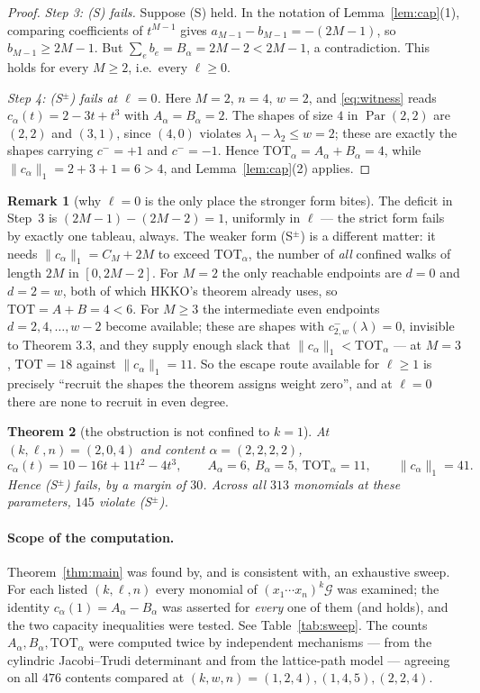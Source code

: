 \documentclass[11pt]{article}
\newtheorem{theorem}{Theorem}
\theoremstyle{definition}
\newtheorem{remark}[theorem]{Remark}
\DeclareMathOperator{\Par}{Par}
\newcommand{\la}{\lambda}
\begin{document}
\begin{proof}
\emph{Step 3: (S) fails.} Suppose (S) held. In the notation of
Lemma~\ref{lem:cap}(1), comparing coefficients of $t^{M-1}$ gives
$a_{M-1}-b_{M-1}=-(2M-1)$, so $b_{M-1}\ge 2M-1$. But
$\sum_e b_e=B_\alpha=2M-2<2M-1$, a contradiction. This holds for every
$M\ge2$, i.e.\ every $\ell\ge0$.

\emph{Step 4: (S$^\pm$) fails at $\ell=0$.} Here $M=2$, $n=4$, $w=2$, and
\eqref{eq:witness} reads $c_\alpha(t)=2-3t+t^{3}$ with $A_\alpha=B_\alpha=2$.
The shapes of size $4$ in $\Par(2,2)$ are $(2,2)$ and $(3,1)$, since $(4,0)$
violates $\la_1-\la_2\le w=2$; these are exactly the shapes carrying
$c^{-}=+1$ and $c^{-}=-1$. Hence $\mathrm{TOT}_\alpha=A_\alpha+B_\alpha=4$,
while $\|c_\alpha\|_1=2+3+1=6>4$, and Lemma~\ref{lem:cap}(2) applies.
\end{proof}

\begin{remark}[why $\ell=0$ is the only place the stronger form bites]
The deficit in Step~3 is $(2M-1)-(2M-2)=1$, uniformly in $\ell$ --- the strict
form fails by exactly one tableau, always. The weaker form (S$^\pm$) is a
different matter: it needs $\|c_\alpha\|_1=C_M+2M$ to exceed
$\mathrm{TOT}_\alpha$, the number of \emph{all} confined walks of length $2M$
in $[0,2M-2]$. For $M=2$ the only reachable endpoints are $d=0$ and $d=2=w$,
both of which HKKO's theorem already uses, so $\mathrm{TOT}=A+B=4<6$. For
$M\ge3$ the intermediate even endpoints $d=2,4,\dots,w-2$ become available;
these are shapes with $c^{-}_{2,w}(\la)=0$, invisible to Theorem 3.3, and they
supply enough slack that $\|c_\alpha\|_1<\mathrm{TOT}_\alpha$ --- at $M=3$,
$\mathrm{TOT}=18$ against $\|c_\alpha\|_1=11$. So the escape route available
for $\ell\ge1$ is precisely ``recruit the shapes the theorem assigns weight
zero'', and at $\ell=0$ there are none to recruit in even degree.
\end{remark}

\begin{theorem}[the obstruction is not confined to $k=1$]\label{thm:k2}
At $(k,\ell,n)=(2,0,4)$ and content $\alpha=(2,2,2,2)$,
\[
 c_\alpha(t)=10-16t+11t^{2}-4t^{3},\qquad A_\alpha=6,\ B_\alpha=5,\
 \mathrm{TOT}_\alpha=11,\qquad \|c_\alpha\|_1=41 .
\]
Hence \textup{(S$^\pm$)} fails, by a margin of $30$. Across all $313$ monomials
at these parameters, $145$ violate \textup{(S$^\pm$)}.
\end{theorem}

\paragraph{Scope of the computation.} Theorem~\ref{thm:main} was found by, and is consistent with, an exhaustive
sweep. For each listed $(k,\ell,n)$ every
monomial of $(x_1\cdots x_n)^{k}\mathcal G$ was examined; the identity
$c_\alpha(1)=A_\alpha-B_\alpha$ was asserted for \emph{every} one of them (and
holds), and the two capacity inequalities were tested. See
Table~\ref{tab:sweep}. The counts $A_\alpha,B_\alpha,\mathrm{TOT}_\alpha$ were
computed twice by independent mechanisms --- from the cylindric Jacobi--Trudi
determinant \cite[Thm.~2.10]{HKKO} and from the lattice-path model
\cite[Prop.~2.7]{HKKO} --- agreeing on all $476$ contents compared at
$(k,w,n)=(1,2,4),(1,4,5),(2,2,4)$.
\end{document}

